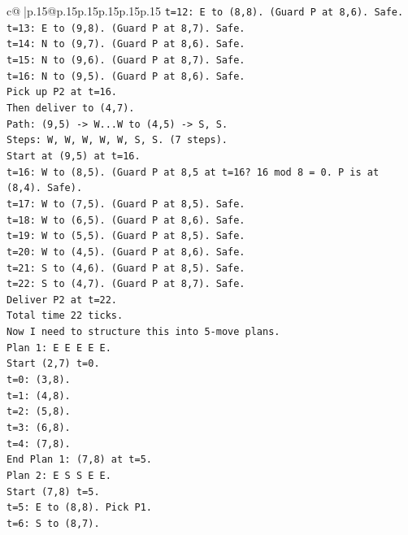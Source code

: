 \documentclass{article}
\begin{document}
{\begin{supertabular}{c@{$\;$}|p{.15\linewidth}@{}p{.15\linewidth}p{.15\linewidth}p{.15\linewidth}p{.15\linewidth}p{.15\linewidth}}
{{{\texttt{t=12: E to (8,8). (Guard P at 8,6). Safe.} \\
\texttt{t=13: E to (9,8). (Guard P at 8,7). Safe.} \\
\texttt{t=14: N to (9,7). (Guard P at 8,6). Safe.} \\
\texttt{t=15: N to (9,6). (Guard P at 8,7). Safe.} \\
\texttt{t=16: N to (9,5). (Guard P at 8,6). Safe.} \\
\texttt{Pick up P2 at t=16.} \\
\texttt{Then deliver to (4,7).} \\
\texttt{Path: (9,5) {-}> W...W to (4,5) {-}> S, S.} \\
\texttt{Steps: W, W, W, W, W, S, S. (7 steps).} \\
\texttt{Start at (9,5) at t=16.} \\
\texttt{t=16: W to (8,5). (Guard P at 8,5 at t=16? 16 mod 8 = 0. P is at (8,4). Safe).} \\
\texttt{t=17: W to (7,5). (Guard P at 8,5). Safe.} \\
\texttt{t=18: W to (6,5). (Guard P at 8,6). Safe.} \\
\texttt{t=19: W to (5,5). (Guard P at 8,5). Safe.} \\
\texttt{t=20: W to (4,5). (Guard P at 8,6). Safe.} \\
\texttt{t=21: S to (4,6). (Guard P at 8,5). Safe.} \\
\texttt{t=22: S to (4,7). (Guard P at 8,7). Safe.} \\
\texttt{Deliver P2 at t=22.} \\
\texttt{Total time 22 ticks.} \\
\texttt{Now I need to structure this into 5{-}move plans.} \\
\texttt{Plan 1: E E E E E.} \\
\texttt{Start (2,7) t=0.} \\
\texttt{t=0: (3,8).} \\
\texttt{t=1: (4,8).} \\
\texttt{t=2: (5,8).} \\
\texttt{t=3: (6,8).} \\
\texttt{t=4: (7,8).} \\
\texttt{End Plan 1: (7,8) at t=5.} \\
\texttt{Plan 2: E S S E E.} \\
\texttt{Start (7,8) t=5.} \\
\texttt{t=5: E to (8,8). Pick P1.} \\
\texttt{t=6: S to (8,7).} \\
}}}
\end{supertabular}}
\end{document}
